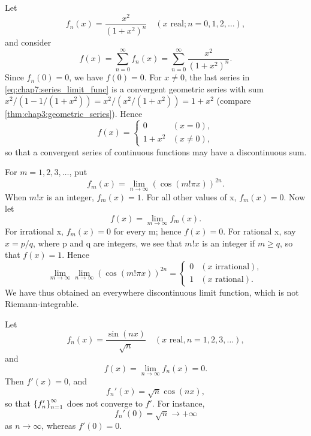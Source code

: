 \begin{example} %
  \label{ex:chap7:series_limit}
  Let
  \[ f_n(x) = \frac{x^2}{(1+x^2)^n} \quad (x \text{ real}; n=0, 1, 2, \dots), \]
  and consider
  \begin{equation} \label{eq:chap7:series_limit_func}
    f(x) = \sum_{n=0}^\infty f_n(x) = \sum_{n=0}^\infty \frac{x^2}{(1+x^2)^n}.
  \end{equation}
  Since $f_n(0) = 0$, we have $f(0)=0$. For $x \ne 0$, the last
  series in \eqref{eq:chap7:series_limit_func} is a convergent
  geometric series with sum $x^2 / (1 - 1/(1+x^2)) = x^2 /
  (x^2/(1+x^2)) = 1+x^2$ (compare \autoref{thm:chap3:geometric_series}). Hence
  \begin{equation} \label{eq:chap7:series_limit_result}
    f(x) =
    \begin{cases} 0 & (x=0), \\ 1+x^2 & (x \ne 0),
    \end{cases}
  \end{equation}
  so that a convergent series of continuous functions may have a
  discontinuous sum.
\end{example}

\begin{example} %
  \label{ex:chap7:dirichlet_limit}
  For $m=1, 2, 3, \dots$, put
  \[ f_m(x) = \lim_{n \to \infty} (\cos(m! \pi x))^{2n}. \]
  When $m!x$ is an integer, $f_m(x)=1$. For all other values of x,
  $f_m(x)=0$. Now let
  \[ f(x) = \lim_{m \to \infty} f_m(x). \]
  For irrational x, $f_m(x)=0$ for every m; hence $f(x)=0$. For
  rational x, say $x=p/q$, where p and q are integers, we see that
  $m!x$ is an integer if $m \ge q$, so that $f(x)=1$. Hence
  \begin{equation} \label{eq:chap7:dirichlet_result}
    \lim_{m \to \infty} \lim_{n \to \infty} (\cos(m! \pi x))^{2n} =
    \begin{cases} 0 & (x \text{ irrational}), \\ 1 & (x \text{ rational}).
    \end{cases}
  \end{equation}
  We have thus obtained an everywhere discontinuous limit function,
  which is not Riemann-integrable. %
\end{example}

\begin{example} %
  \label{ex:chap7:deriv_limit_swap}
  Let
  \begin{equation} \label{eq:chap7:deriv_limit_fn}
    f_n(x) = \frac{\sin(nx)}{\sqrt{n}} \quad (x \text{ real}, n=1, 2, 3, \dots),
  \end{equation}
  and
  \[ f(x) = \lim_{n \to \infty} f_n(x) = 0. \]
  Then $f'(x)=0$, and
  \[ f_n'(x) = \sqrt{n} \cos(nx), \]
  so that $\left\{ f'_n \right\}_{n=1}^\infty$ does not converge to $f'$. For instance,
  \[ f_n'(0) = \sqrt{n} \to +\infty \]
  as $n \to \infty$, whereas $f'(0)=0$.
\end{example}


